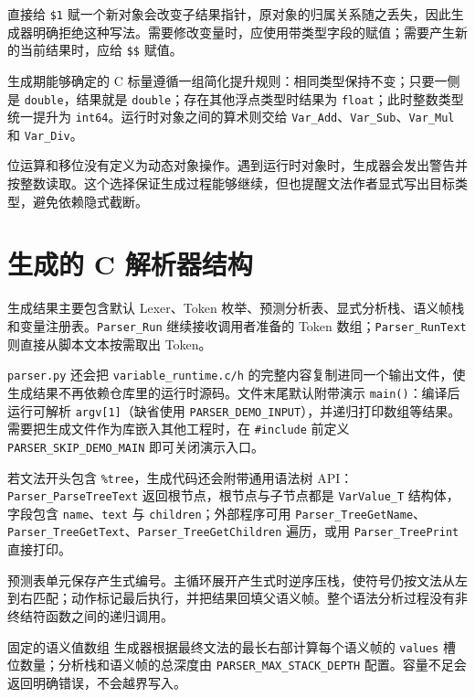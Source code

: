 直接给 \texttt{\$1} 赋一个新对象会改变子结果指针，原对象的归属关系随之丢失，因此生成器明确拒绝这种写法。需要修改变量时，应使用带类型字段的赋值；需要产生新的当前结果时，应给 \texttt{\$\$} 赋值。

生成期能够确定的 C 标量遵循一组简化提升规则：相同类型保持不变；只要一侧是 \texttt{double}，结果就是 \texttt{double}；存在其他浮点类型时结果为 \texttt{float}；此时整数类型统一提升为 \texttt{int64}。运行时对象之间的算术则交给 \texttt{Var\_Add}、\texttt{Var\_Sub}、\texttt{Var\_Mul} 和 \texttt{Var\_Div}。

位运算和移位没有定义为动态对象操作。遇到运行时对象时，生成器会发出警告并按整数读取。这个选择保证生成过程能够继续，但也提醒文法作者显式写出目标类型，避免依赖隐式截断。

\section{生成的 C 解析器结构}

生成结果主要包含默认 Lexer、Token 枚举、预测分析表、显式分析栈、语义帧栈和变量注册表。\texttt{Parser\_Run} 继续接收调用者准备的 Token 数组；\texttt{Parser\_RunText} 则直接从脚本文本按需取出 Token。

\texttt{parser.py} 还会把 \texttt{variable\_runtime.c/h} 的完整内容复制进同一个输出文件，使生成结果不再依赖仓库里的运行时源码。文件末尾默认附带演示 \texttt{main()}：编译后运行可解析 \texttt{argv[1]}（缺省使用 \texttt{PARSER\_DEMO\_INPUT}），并递归打印数组等结果。需要把生成文件作为库嵌入其他工程时，在 \texttt{\#include} 前定义 \texttt{PARSER\_SKIP\_DEMO\_MAIN} 即可关闭演示入口。

若文法开头包含 \texttt{\%tree}，生成代码还会附带通用语法树 API：\texttt{Parser\_ParseTreeText} 返回根节点，根节点与子节点都是 \texttt{VarValue\_T} 结构体，字段包含 \texttt{name}、\texttt{text} 与 \texttt{children}；外部程序可用 \texttt{Parser\_TreeGetName}、\texttt{Parser\_TreeGetText}、\texttt{Parser\_TreeGetChildren} 遍历，或用 \texttt{Parser\_TreePrint} 直接打印。

预测表单元保存产生式编号。主循环展开产生式时逆序压栈，使符号仍按文法从左到右匹配；动作标记最后执行，并把结果回填父语义帧。整个语法分析过程没有非终结符函数之间的递归调用。

\begin{anybox}{固定的语义值数组}
生成器根据最终文法的最长右部计算每个语义帧的 \texttt{values} 槽位数量；分析栈和语义帧的总深度由 \texttt{PARSER\_MAX\_STACK\_DEPTH} 配置。容量不足会返回明确错误，不会越界写入。
\end{anybox}

